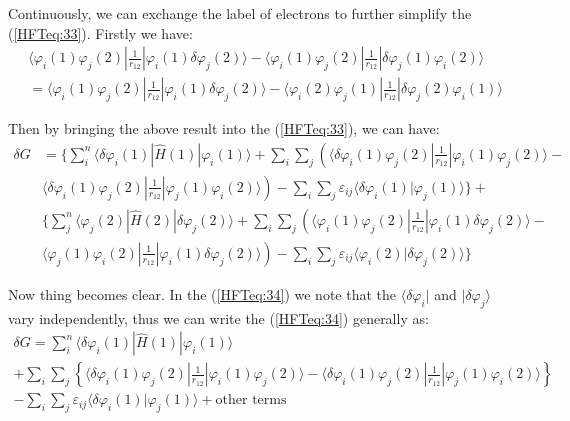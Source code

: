 Continuously, we can exchange the label of electrons to further
simplify the (\ref{HFTeq:33}). Firstly we have:
\begin{equation}\label{}
\begin{split}
& \langle\varphi_{i}(1)\varphi_{j}(2)|\frac{1}{r_{12}}|
\varphi_{i}(1)\delta\varphi_{j}(2)\rangle -
\langle\varphi_{i}(1)\varphi_{j}(2)|\frac{1}{r_{12}}|
\delta\varphi_{j}(1)\varphi_{i}(2)\rangle \\
&= \langle\varphi_{i}(1)\varphi_{j}(2)|\frac{1}{r_{12}}|
\varphi_{i}(1)\delta\varphi_{j}(2)\rangle -
\langle\varphi_{i}(2)\varphi_{j}(1)|\frac{1}{r_{12}}|
\delta\varphi_{j}(2)\varphi_{i}(1)\rangle
\end{split}
\end{equation}

Then by bringing the above result into the (\ref{HFTeq:33}), we can
have:
\begin{equation}\label{HFTeq:34}
\begin{split}
\delta G  &= \Bigg\{ \sum_{i}^{n}
\langle\delta\varphi_{i}(1)|\hat{H}(1)|\varphi_{i}(1)\rangle
 +
\sum_{i}\sum_{j} \left(
\langle\delta\varphi_{i}(1)\varphi_{j}(2)|\frac{1}{r_{12}}|
\varphi_{i}(1)\varphi_{j}(2)\rangle - \right. \\
&\left.\langle\delta\varphi_{i}(1)\varphi_{j}(2)|\frac{1}{r_{12}}|
\varphi_{j}(1)\varphi_{i}(2)\rangle \right) - \sum_{i}\sum_{j}
\varepsilon_{ij}
\langle\delta\varphi_{i}(1)|\varphi_{j}(1)\rangle \Bigg\} + \\
&\Bigg\{ \sum_{j}^{n}
\langle\varphi_{j}(2)|\hat{H}(2)|\delta\varphi_{j}(2)\rangle
 +
\sum_{i}\sum_{j} \left(
\langle\varphi_{i}(1)\varphi_{j}(2)|\frac{1}{r_{12}}|
\varphi_{i}(1)\delta\varphi_{j}(2)\rangle - \right. \\
&\left.\langle\varphi_{j}(1)\varphi_{i}(2)|\frac{1}{r_{12}}|
\varphi_{i}(1)\delta\varphi_{j}(2)\rangle \right) - \sum_{i}\sum_{j}
\varepsilon_{ij}
\langle\varphi_{i}(2)|\delta\varphi_{j}(2)\rangle\Bigg\}
\end{split}
\end{equation}

Now thing becomes clear. In the (\ref{HFTeq:34}) we note that the
$\langle\delta\varphi_{i}|$ and $|\delta\varphi_{j}\rangle$ vary
independently, thus we can write the (\ref{HFTeq:34}) generally as:
\begin{multline}\label{HFTeq:5}
\delta G = \sum_{i}^{n}
\langle\delta\varphi_{i}(1)|\hat{H}(1)|\varphi_{i}(1)\rangle \\
+ \sum_{i}\sum_{j} \left\{
\langle\delta\varphi_{i}(1)\varphi_{j}(2)|\frac{1}{r_{12}}|\varphi_{i}(1)\varphi_{j}(2)\rangle
-
\langle\delta\varphi_{i}(1)\varphi_{j}(2)|\frac{1}{r_{12}}|\varphi_{j}(1)\varphi_{i}(2)\rangle
\right\} \\
- \sum_{i}\sum_{j} \varepsilon_{ij}
\langle\delta\varphi_{i}(1)|\varphi_{j}(1)\rangle + \text {other
terms}
\end{multline}

